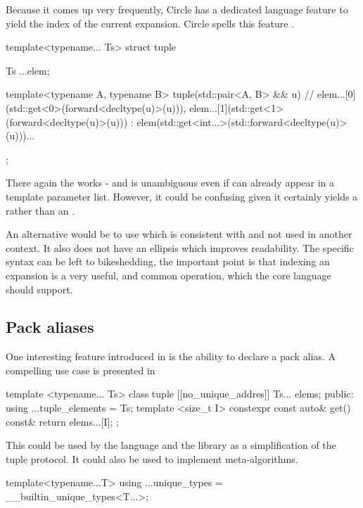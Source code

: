 \documentclass{wg21}
\begin{document}
Because it comes up very frequently, Circle has a dedicated language feature to yield the index of the current expansion.
Circle spells this feature .

\begin{colorblock}
template<typename... Ts>
struct tuple {
Ts ...elem;

template<typename A, typename B>
tuple(std::pair<A, B> && u)
 // elem...[0](std::get<0>(forward<decltype(u)>(u))), elem...[1](std::get<1>(forward<decltype(u)>(u)))
: elem(std::get<int...>(std::forward<decltype(u)>(u)))...
{ }
};
\end{colorblock}

There again the  works - and is unambiguous even if  can already appear in a template parameter list.
However, it could be confusing given it certainly yields a  rather than an .

An alternative would be to use \tcode{[:]} which is consistent with  and not used in another context.
It also does not have an ellipsis which improves readability.
The specific syntax can be left to bikeshedding, the important point is that indexing an expansion is a very useful, and common operation,
which the core language should support.


\subsection{Pack aliases}

One interesting feature introduced in  is the ability to declare a pack alias.
A compelling use case is presented in 

\begin{colorblock}
    template <typename... Ts>
    class tuple {
        [[no_unique_addres]] Ts... elems;
    public:
        using ...tuple_elements = Ts;
        template <size_t I>
        constexpr const auto& get() const& {
            return elems...[I];
        }
    };
\end{colorblock}

This could be used by the language and the library as a simplification of the tuple protocol.
It could also be used to implement meta-algorithms.

\begin{colorblock}
    template<typename...T>
    using ...unique_types = __builtin_unique_types<T...>;
\end{colorblock}
\end{document}
